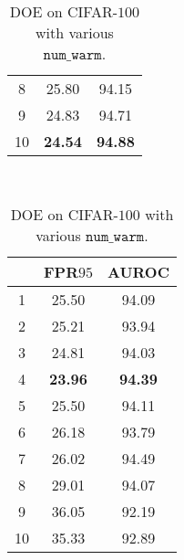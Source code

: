 \documentclass{article} \usepackage{iclr2022_conference,times}
\begin{document}
\begin{table}[t]
{{\begin{tabular}{c|cc}
8               & 25.80                  & 94.15                  \\
9               & 24.83                  & 94.71                  \\
\cellcolor{greyL}10              & \cellcolor{greyL}\textbf{24.54}                  & \cellcolor{greyL}\textbf{94.88}                  \\
\bottomrule[1.5pt]      
\end{tabular}
}}~~
\parbox{.23\linewidth}{
\centering
\scriptsize
\caption{DOE on CIFAR-$100$ with various $\texttt{num\_warm}$.} \label{tab: hyper_warm}
\vspace{5pt}
{
\begin{tabular}{c|cc}
\toprule[1.5pt]
                   & FPR$95$                & AUROC               \\
\midrule[0.6pt]
1               & 25.50                  & 94.09                  \\
2               & 25.21                  & 93.94                  \\
3               & 24.81                  & 94.03                  \\
\cellcolor{greyL}4               & \cellcolor{greyL}\textbf{23.96}                  & \cellcolor{greyL}\textbf{94.39}                  \\
5               & 25.50                  & 94.11                  \\
6               & 26.18                  & 93.79                  \\
7               & 26.02                  & 94.49                  \\
8               & 29.01                  & 94.07                  \\
9               & 36.05                  & 92.19                  \\
10              & 35.33                  & 92.89                  \\
\bottomrule[1.5pt]      
\end{tabular}
}}
\end{table}
\end{document}
